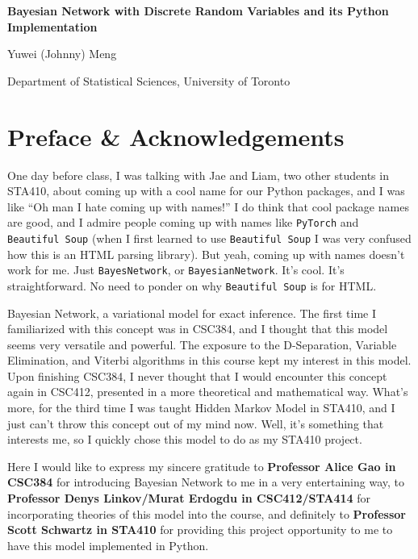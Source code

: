 \documentclass{article}
\theoremstyle{definition}
\begin{document}
\pagestyle{fancy}
\fancyhead[C]{\nouppercase{\leftmark}}

\begin{titlepage}
    \centering
    \vspace*{3cm}
    {\huge \bfseries Bayesian Network with Discrete Random Variables and its Python Implementation \par}
    \vspace{5cm}
    {\Large Yuwei (Johnny) Meng \par}
    \vspace{3cm}
    {\large Department of Statistical Sciences, University of Toronto}
    \vfill
\end{titlepage}

\tableofcontents

\pagebreak

\section{Preface \& Acknowledgements}

One day before class, I was talking with Jae and Liam, two other students in STA410, about coming up with a cool name for our Python packages, and I was like ``Oh man I hate coming up with names!'' I do think that cool package names are good, and I admire people coming up with names like \texttt{PyTorch} and \texttt{Beautiful Soup} (when I first learned to use \texttt{Beautiful Soup} I was very confused how this is an HTML parsing library). But yeah, coming up with names doesn't work for me. Just \texttt{BayesNetwork}, or \texttt{BayesianNetwork}. It's cool. It's straightforward. No need to ponder on why \texttt{Beautiful Soup} is for HTML.

Bayesian Network, a variational model for exact inference. The first time I familiarized with this concept was in CSC384, and I thought that this model seems very versatile and powerful. The exposure to the D-Separation, Variable Elimination, and Viterbi algorithms in this course kept my interest in this model. Upon finishing CSC384, I never thought that I would encounter this concept again in CSC412, presented in a more theoretical and mathematical way. What's more, for the third time I was taught Hidden Markov Model in STA410, and I just can't throw this concept out of my mind now. Well, it's something that interests me, so I quickly chose this model to do as my STA410 project.

Here I would like to express my sincere gratitude to \textbf{Professor Alice Gao in CSC384} for introducing Bayesian Network to me in a very entertaining way, to \textbf{Professor Denys Linkov/Murat Erdogdu in CSC412/STA414} for incorporating theories of this model into the course, and definitely to \textbf{Professor Scott Schwartz in STA410} for providing this project opportunity to me to have this model implemented in Python.
\end{document}
